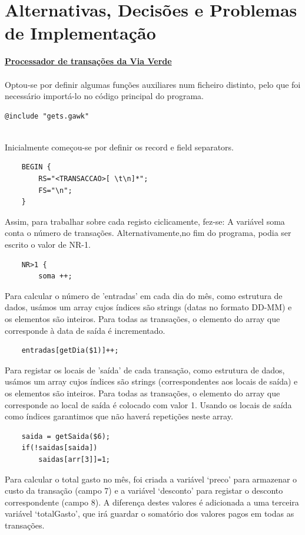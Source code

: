 \documentclass{report}
\begin{document}
\section{Alternativas, Decisões e Problemas de Implementação}
\textbf{\underline{Processador de transações da Via Verde}}
\\
\\
Optou-se por definir algumas funções auxiliares num ficheiro distinto, pelo que foi necessário importá-lo no código principal do programa.
\\
\begin{verbatim}
@include "gets.gawk"
\end{verbatim}
\\
Inicialmente começou-se por definir os record e field separators.
\begin{verbatim}
	BEGIN {
		RS="<TRANSACCAO>[ \t\n]*";
		FS="\n";
	}
\end{verbatim}
Assim, para trabalhar sobre cada registo ciclicamente, fez-se:
A variável soma conta o número de transações. Alternativamente,no fim do programa, podia ser escrito o valor de NR-1.
\begin{verbatim}
	NR>1 {
		soma ++;

\end{verbatim}
Para calcular o número de 'entradas' em cada dia do mês, como estrutura de dados, usámos um array cujos índices são strings (datas no formato DD-MM) e os elementos são inteiros. Para todas as transações, o elemento do array que corresponde à data de saída é incrementado.
\begin{verbatim}
	entradas[getDia($1)]++;
\end{verbatim}
Para registar os locais de 'saída' de cada transação, como estrutura de dados, usámos um array cujos índices são strings (correspondentes aos locais de saída) e os elementos são inteiros. Para todas as transações, o elemento do array que corresponde ao local de saída é colocado com valor 1. Usando os locais de saída como índices garantimos que não haverá repetições neste array.
\begin{verbatim}
	saida = getSaida($6);
	if(!saidas[saida])
    	saidas[arr[3]]=1;
\end{verbatim}
Para calcular o total gasto no mês, foi criada a variável ‘preco’ para armazenar o custo da transação (campo 7) e a variável ‘desconto’ para registar o desconto correspondente (campo 8). A diferença destes valores é adicionada a uma terceira variável ‘totalGasto’, que irá guardar o somatório dos valores pagos em todas as transações.
\end{document}
